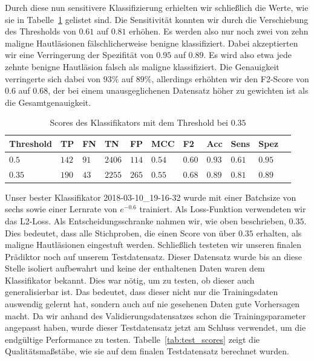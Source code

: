 Durch diese nun sensitivere Klassifizierung erhielten wir schließlich die Werte, wie sie in Tabelle~\ref{tab:final_scores} gelistet sind. Die Sensitivität konnten wir durch die Verschiebung des Thresholds von $0.61$ auf $0.81$ erhöhen. Es werden also nur noch zwei von zehn maligne Hautläsionen fälschlicherweise benigne klassifiziert. Dabei akzeptierten wir eine Verringerung der Spezifität von $0.95$ auf $0.89$. Es wird also etwa jede zehnte benigne Hautläsion falsch als maligne klassifiziert. Die Genauigkeit verringerte sich dabei von $93\%$ auf $89\%$, allerdings erhöhten wir den F2-Score von $0.6$ auf $0.68$, der bei einem unausgeglichenen Datensatz höher zu gewichten ist als die Gesamtgenauigkeit.

\begin{table}[htb!]
\begin{center}
\begin{tabular}{lllllllllll}
	\toprule
 	Threshold  & TP & FN & TN & FP & MCC & F2 & Acc & Sens & Spez\\
	\midrule
    $0.5$ & $142$&	$91$ &	$2406$ &	$114$ &	$0.54$ 	&$0.60$	&$0.93$	&$0.61$&	$0.95$ \\
	$0.35$ & $190$ & $43$ &	$2255$ &	$265$ &	$0.55$ &	$0.68$&	$0.89$ &	$0.81$ & $0.89$\\
 \bottomrule
 \end{tabular}
 \end{center}
  \caption{Scores des Klassifikators mit dem Threshold bei $0.35$}
 \label{tab:final_scores}
 \end{table}

Unser bester Klassifikator 2018-03-10\_19-16-32 wurde mit einer Batchsize von sechs sowie einer Lernrate von $e^{-0.6}$ trainiert. Als Loss-Funktion verwendeten wir das L2-Loss. Als Entscheidungsschranke nahmen wir, wie oben beschrieben, $0.35$. Dies bedeutet, dass alle Stichproben, die einen Score von über $0.35$ erhalten, als maligne Hautläsionen eingestuft werden. Schließlich testeten wir unseren finalen Prädiktor noch auf unserem Testdatensatz. Dieser Datensatz wurde bis an diese Stelle isoliert aufbewahrt und keine der enthaltenen Daten waren dem Klassifikator bekannt. Dies war nötig, um zu testen, ob dieser auch generalisierbar ist. Das bedeutet, dass dieser nicht nur die Trainingsdaten auswendig gelernt hat, sondern auch auf nie gesehenen Daten gute Vorhersagen macht. Da wir anhand des Validierungsdatensatzes schon die Trainingsparameter angepasst haben, wurde dieser Testdatensatz jetzt am Schluss verwendet, um die endgültige Performance zu testen. Tabelle~\ref{tab:test_scores} zeigt die Qualitätsmaßstäbe, wie sie auf dem finalen Testdatensatz berechnet wurden.

